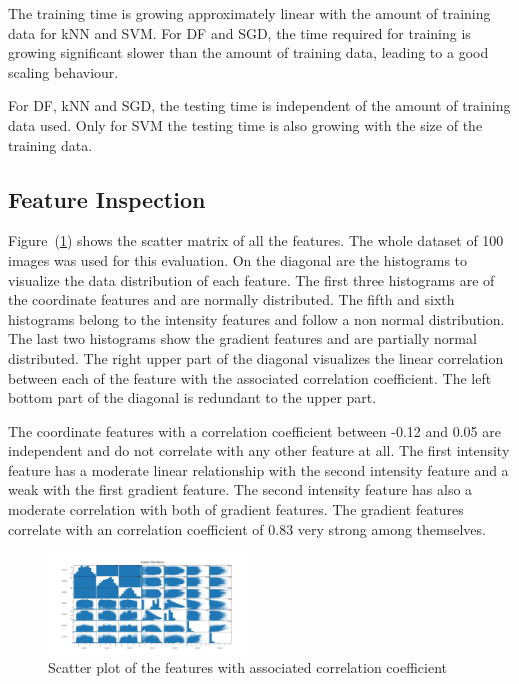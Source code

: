 \documentclass[journal]{IEEEtran}
\begin{document}
The training time is growing approximately linear with the amount of training data for kNN and SVM. For DF and SGD, the time required for training is growing significant slower than the amount of training data, leading to a good scaling behaviour.

For DF, kNN and SGD, the testing time is independent of the amount of training data used. Only for SVM the testing time is also growing with the size of the training data.

\subsection{Feature Inspection}


Figure~(\ref{scatterplot}) shows the scatter matrix of all the features. The whole dataset of 100 images was used for this evaluation. On the diagonal are the histograms to visualize the data distribution of each feature. The first three histograms are of the coordinate features and are normally distributed. The fifth and sixth histograms belong to the intensity features and follow a non normal distribution. The last two histograms show the gradient features and are partially normal distributed. The right upper part of the diagonal visualizes the linear correlation between each of the feature with the associated correlation coefficient. The left bottom part of the diagonal is redundant to the upper part. 

The coordinate features with a correlation coefficient between -0.12 and 0.05 are independent and do not correlate with any other feature at all. The first intensity feature has a moderate linear relationship with the second intensity feature and a weak with the first gradient feature. The second intensity feature has also a moderate correlation with both of gradient features. The gradient features correlate with an correlation coefficient of 0.83 very strong among themselves.


\begin{figure}[h]
	\centering
	\includegraphics[width=0.48\textwidth]{images/ScatterPlotMatrix}
	\caption{Scatter plot of the features with associated correlation coefficient}
	\label{scatterplot}
\end{figure}
\end{document}
